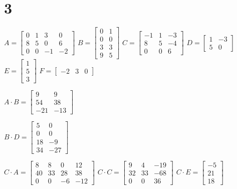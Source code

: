 \documentclass{article}
\begin{document}
\newpage
\section*{3}
$A=\begin{bmatrix}
    0&1&3&0\\
    8&5&0&6\\
    0&0&-1&-2
\end{bmatrix}$
$B=\begin{bmatrix}
    0&1\\
    0&0\\
    3&3\\
    9&5
\end{bmatrix}$
$C=\begin{bmatrix}
    -1&1&-3\\
    8&5&-4\\
    0&0&6
\end{bmatrix}$
$D=\begin{bmatrix}
    1&-3\\
    5&0
\end{bmatrix}$\\
$E=\begin{bmatrix}
    1\\5\\3
\end{bmatrix}$
$F=\begin{bmatrix}
    -2&3&0
\end{bmatrix}$


$A\cdot B=\begin{bmatrix}
    9&9\\
    54&38\\
    -21&-13
\end{bmatrix}$


$B\cdot D=\begin{bmatrix}
    5&0\\
    0&0\\
    18&-9\\
    34&-27
\end{bmatrix}$


$C\cdot A=\begin{bmatrix}
    8&8&0&12\\
    40&33&28&38\\
    0&0&-6&-12
\end{bmatrix}$
$C\cdot C=\begin{bmatrix}
    9&4&-19\\
    32&33&-68\\
    0&0&36
\end{bmatrix}$
$C\cdot E=\begin{bmatrix}
    -5\\
    21\\
    18
\end{bmatrix}$
\end{document}
